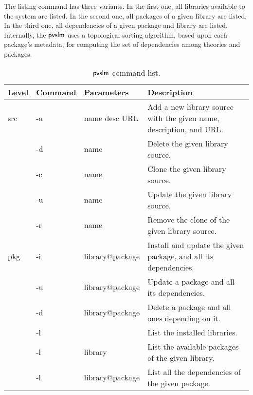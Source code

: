 The listing command has three variants. In the first one, all
libraries available to the system are listed. In the second one, all
packages of a given library are listed. In the third one, all
dependencies of a given package and library are listed. Internally,
the $\textsf{pvslm}$ uses a topological sorting algorithm, based upon each
package's metadata, for computing the set of dependencies among
theories and packages.

\begin{table*}[pthb]
  \begin{center}
    \begin{tabular}{ | l | l | l | p{6cm} | }
      \hline Level & Command & Parameters & Description \\ \hline
      src & -a          & name desc URL         & Add a new library source with the given name, description, and URL.                   \\ \cline{2-4}
          & -d          & name                  & Delete the given library source.                                          \\ \cline{2-4}
          & -c          & name                  & Clone the given library source.                          \\ \cline{2-4}
          & -u          & name                  & Update the given library source.                                \\ \cline{2-4}
          & -r          & name                  & Remove the clone of the given library source.                                                  \\ \hline
      pkg & -i          & library@package       & Install and update the given package, and all its dependencies.                \\ \cline{2-4}
          & -u          & library@package       & Update a package and all its dependencies.                   \\ \cline{2-4}
          & -d          & library@package       & Delete a  package and all ones depending on it.           \\ \cline{2-4}
          & -l          &                       & List the installed libraries.                                       \\ \cline{2-4}
          & -l          & library               & List the available packages of the given library.                         \\ \cline{2-4}
          & -l          & library@package       & List all the dependencies of the given package.                               \\ \hline
    \end{tabular}
  \end{center}
  \caption{$\textsf{pvslm}$ command list.}
  \label{tab.cmd}
\end{table*}

